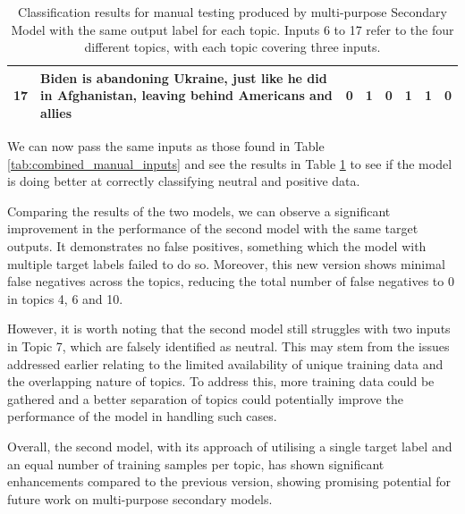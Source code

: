 \begin{table}[ht]
{\begin{tabular}{lp{10cm}cccccc}
            17                                 & Biden is abandoning Ukraine, just like he did in Afghanistan, leaving behind Americans and allies                          & 0                                & 1               & 0       & 1      & 1      & 0               \\
            \bottomrule
        \end{tabular}%
    }
    \vspace{5pt}
    \caption{Classification results for manual testing produced by multi-purpose Secondary Model with the same output label for each topic. Inputs 6 to 17 refer to the four different topics, with each topic covering three inputs.}
    \label{tab:combined_sl_manual_inputs}
\end{table}

We can now pass the same inputs as those found in Table \ref{tab:combined_manual_inputs} and see the results in Table \ref{tab:combined_sl_manual_inputs} to see if the model is doing better at correctly classifying neutral and positive data.

Comparing the results of the two models, we can observe a significant improvement in the performance of the second model with the same target outputs. It demonstrates no false positives, something which the model with multiple target labels failed to do so. Moreover, this new version shows minimal false negatives across the topics, reducing the total number of false negatives to 0 in topics 4, 6 and 10.

However, it is worth noting that the second model still struggles with two inputs in Topic 7, which are falsely identified as neutral. This may stem from the issues addressed earlier relating to the limited availability of unique training data and the overlapping nature of topics. To address this, more training data could be gathered and a better separation of topics could potentially improve the performance of the model in handling such cases.

Overall, the second model, with its approach of utilising a single target label and an equal number of training samples per topic, has shown significant enhancements compared to the previous version, showing promising potential for future work on multi-purpose secondary models.

